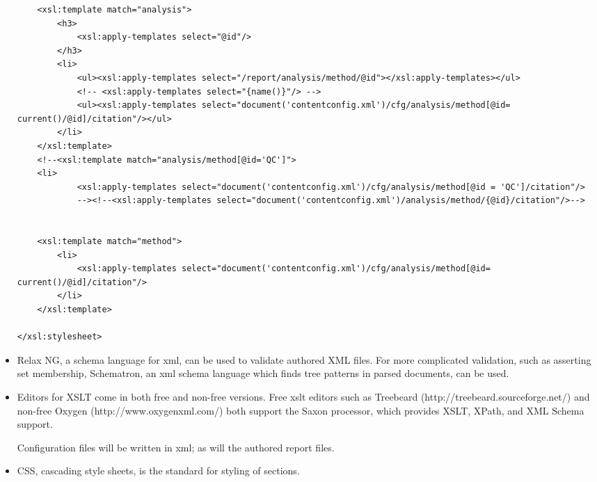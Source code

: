 \documentclass{article}
\begin{document}
\begin{itemize}
\begin{lstlisting}
    <xsl:template match="analysis">
        <h3>
            <xsl:apply-templates select="@id"/>
        </h3>  
        <li>
            <ul><xsl:apply-templates select="/report/analysis/method/@id"></xsl:apply-templates></ul>
            <!-- <xsl:apply-templates select="{name()}"/> -->
            <ul><xsl:apply-templates select="document('contentconfig.xml')/cfg/analysis/method[@id= current()/@id]/citation"/></ul>
        </li>
    </xsl:template>
    <!--<xsl:template match="analysis/method[@id='QC']">
    <li>
            <xsl:apply-templates select="document('contentconfig.xml')/cfg/analysis/method[@id = 'QC']/citation"/>
            --><!--<xsl:apply-templates select="document('contentconfig.xml')/analysis/method/{@id}/citation"/>-->
    

    <xsl:template match="method">
        <li>
            <xsl:apply-templates select="document('contentconfig.xml')/cfg/analysis/method[@id= current()/@id]/citation"/>
        </li>
    </xsl:template>
    
</xsl:stylesheet>

\end{lstlisting}

\item Relax NG, a schema language for xml, can be used to validate authored XML files.  For more complicated validation, such as asserting set membership, Schematron, an xml schema language which finds tree patterns in parsed documents, can be used. 

\item Editors for XSLT come in both free and non-free versions.  Free xslt editors such as Treebeard (http://treebeard.sourceforge.net/) and non-free Oxygen (http://www.oxygenxml.com/) both support the Saxon processor, which provides XSLT, XPath, and XML Schema support.   

Configuration files will be written in xml; as will the authored report files.

\item CSS, cascading style sheets, is the standard for styling of sections. 


\end{itemize}
\end{document}
